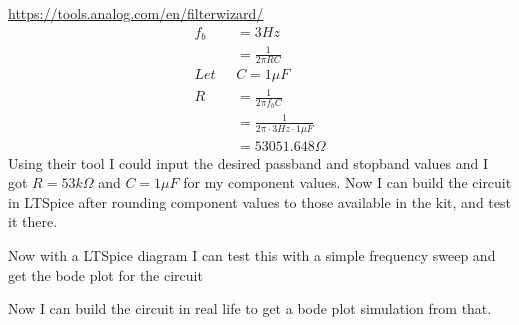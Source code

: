 \documentclass{article}
\begin{document}
\url{https://tools.analog.com/en/filterwizard/}
\begin{align}
    f_b &= 3Hz \\
    &= \frac{1}{2\pi RC}\\
    Let\text{ }&C = 1\mu F\\
    R &= \frac{1}{2\pi f_bC}\\
    &= \frac{1}{2\pi \cdot3Hz \cdot 1\mu F}\\
    &= 53051.648\Omega
\end{align}
Using their tool I could input the desired passband and stopband values and I got $R = 53k\Omega$ and $C = 1\mu F$ for my component values. Now I can build the circuit in LTSpice after rounding component values to those available in the kit, and test it there.
\begin{center}
\end{center}
Now with a LTSpice diagram I can test this with a simple frequency sweep and get the bode plot for the circuit
\begin{center}
\end{center}
Now I can build the circuit in real life to get a bode plot simulation from that.
\begin{center}
\end{center}
\end{document}
